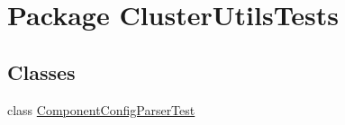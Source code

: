 \hypertarget{namespace_cluster_utils_tests}{}\section{Package Cluster\+Utils\+Tests}
\label{namespace_cluster_utils_tests}
\subsection*{Classes}
\begin{DoxyCompactItemize}
\item 
class \hyperlink{class_cluster_utils_tests_1_1_component_config_parser_test}{Component\+Config\+Parser\+Test}
\end{DoxyCompactItemize}
